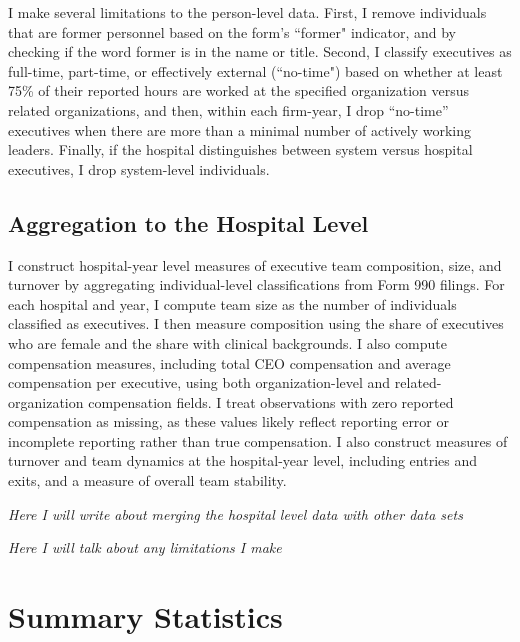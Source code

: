 \documentclass[12pt]{article}
\begin{document}
    I make several limitations to the person-level data. First, I remove individuals that are former personnel based on the form's ``former" indicator, and by checking if the word former is in the name or title. Second, I classify executives as full-time, part-time, or effectively external (``no-time") based on whether at least 75\% of their reported hours are worked at the specified organization versus related organizations, and then, within each firm-year, I drop ``no-time” executives when there are more than a minimal number of actively working leaders. Finally, if the hospital distinguishes between system versus hospital executives, I drop system-level individuals.

    \subsection{Aggregation to the Hospital Level}

    I construct hospital-year level measures of executive team composition, size, and turnover by aggregating individual-level classifications from Form 990 filings. For each hospital and year, I compute team size as the number of individuals classified as executives. I then measure composition using the share of executives who are female and the share with clinical backgrounds. I also compute compensation measures, including total CEO compensation and average compensation per executive, using both organization-level and related-organization compensation fields. I treat observations with zero reported compensation as missing, as these values likely reflect reporting error or incomplete reporting rather than true compensation. I also construct measures of turnover and team dynamics at the hospital-year level, including entries and exits, and a measure of overall team stability. 

    \textit{Here I will write about merging the hospital level data with other data sets}

    \textit{Here I will talk about any limitations I make}

    




    \section{Summary Statistics}
\end{document}
